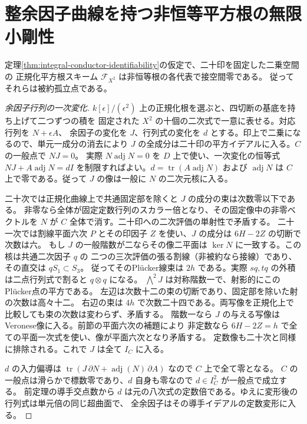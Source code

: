 \section{整余因子曲線を持つ非恒等平方根の無限小剛性}
\label{sec:conductor-root-tangents}
\begin{theorem}\label{thm:conductor-root-tangents}
定理\ref{thm:integral-conductor-identifiability}の仮定で、二十印を固定した二乗空間の
正規化平方根スキーム $\mathcal F_{X^2}$ は非恒等根の各代表で接空間零である。
従ってそれらは被約孤立点である。
\end{theorem}
\begin{proof}[余因子行列の一次変化]
$k[\epsilon]/(\epsilon^2)$ 上の正規化根を選ぶと、四切断の基底を持ち上げて二つずつの積を
固定された $X^2$ の十個の二次式で一意に表せる。対応行列を $N+\epsilon A$、
余因子の変化を $J$、行列式の変化を $d$ とする。印上で二乗になるので、単元一成分の消去により
$J$ の全成分は二十印の平方イデアルに入る。$C$ の一般点で $N J=0$。
実際 $N\operatorname{adj}N=0$ を $D$ 上で使い、一次変化の恒等式
$NJ+A\operatorname{adj}N=dI$ を制限すればよい。$d=\operatorname{tr}(A\operatorname{adj}N)$
および $\operatorname{adj}N$ は $C$ 上で零である。従って $J$ の像は一般に $N$ の二次元核に入る。

二十次では正規化曲線上で共通固定部を除くと $J$ の成分の束は次数零以下である。
非零なら全体が固定定数行列のスカラー倍となり、その固定像中の非零ベクトルを
$N$ が $C$ 全体で消す。二十印への二次評価の単射性で矛盾する。
二十一次では割線平面六次 $P$ とその印因子 $Z$ を使い、$J$ の成分は $6H-2Z$ の切断で次数は六。
もし $J$ の一般階数が二ならその像二平面は $\ker N$ に一致する。この核は共通二次因子 $q$ の
二つの三次評価の張る割線（非被約なら接線）であり、その直交は $q S_1\subset S_3$。
従ってそのPlücker線束は $2h$ である。実際 $sq,tq$ の外積は二点行列式で割ると $q\otimes q$ になる。
$\bigwedge^2 J$ は対称階数一で、射影的にこのPlücker点の平方である。
左辺は次数十二の束の切断であり、固定部を除いた射の次数は高々十二。
右辺の束は $4h$ で次数二十四である。両写像を正規化上で比較しても束の次数は変わらず、矛盾する。
階数一なら $J$ の与える写像はVeronese像に入る。前節の平面六次の補題により
非定数なら $6H-2Z=h$ で全ての平面一次式を使い、像が平面六次となり矛盾する。
定数像も二十次と同様に排除される。これで $J$ は全て $I_C$ に入る。

$d$ の入力偏導は
$\operatorname{tr}(J\,\partial N+\operatorname{adj}(N)\,\partial A)$ なので $C$ 上で全て零となる。
$C$ の一般点は滑らかで標数零であり、$d$ 自身も零なので $d\in I_C^2$ が一般点で成立する。
前定理の導手交点数から $d$ は元の八次式の定数倍である。ゆえに変形後の行列式は単元倍の同じ超曲面で、
全余因子はその導手イデアルの定数変形に入る。
\end{proof}

